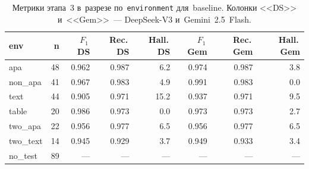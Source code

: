 \begin{table}[h]
\centering
\small
\caption{Метрики этапа~3 в~разрезе по~\texttt{environment} для~baseline. Колонки <<DS>> и~<<Gem>>~--- DeepSeek-V3 и~Gemini~2.5~Flash.}
\label{tab:exp_env_breakdown}
\begin{tabular}{@{}lrrrrrrr@{}}
\toprule
env & n & $F_1$\,DS & Rec.\,DS & Hall.\,DS & $F_1$\,Gem & Rec.\,Gem & Hall.\,Gem \\
\midrule
apa & 48 & 0.962 & 0.987 & 6.2 & 0.974 & 0.987 & 3.8 \\
non_apa & 41 & 0.967 & 0.983 & 4.9 & 0.991 & 0.983 & 0.0 \\
text & 44 & 0.905 & 0.971 & 15.2 & 0.937 & 0.971 & 9.5 \\
table & 20 & 0.986 & 0.973 & 0.0 & 0.973 & 0.973 & 2.7 \\
two_apa & 22 & 0.956 & 0.977 & 6.5 & 0.956 & 0.977 & 6.5 \\
two_text & 14 & 0.945 & 0.929 & 3.7 & 0.949 & 0.933 & 3.4 \\
no_test & 89 & — & — & — & — & — & — \\
\bottomrule
\end{tabular}
\end{table}
